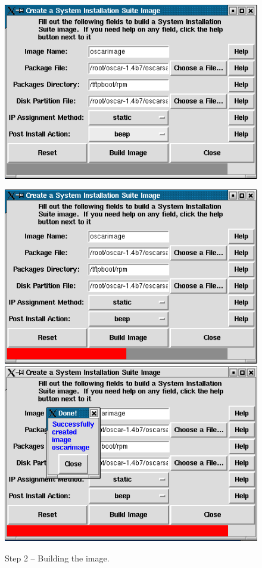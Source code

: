 \begin{figure}[h!]
  \begin{center}
    \centerline{\includegraphics[scale=\imgscale]{figs/4a_sbs-build-image1}}
    \vspace{\imgvskip}
    \centerline{
      \includegraphics[scale=\imgscale]{figs/4b_sbs-build-image2}
      \hspace{\imghskip}
      \includegraphics[scale=\imgscale]{figs/4c_sbs-build-image3}
      }
    \caption{Step 2 -- Building the image.}
    \label{fig:sbs-build-image}
  \end{center}
\end{figure}


